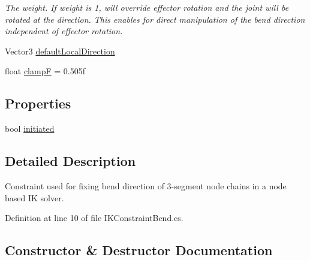 \begin{DoxyCompactItemize}
\begin{DoxyCompactList}\small\item\em The weight. If weight is 1, will override effector rotation and the joint will be rotated at the direction. This enables for direct manipulation of the bend direction independent of effector rotation. \end{DoxyCompactList}\item 
Vector3 \mbox{\hyperlink{class_root_motion_1_1_final_i_k_1_1_i_k_constraint_bend_a763b81b36642630acc2cb8b3720ffd3e}{default\+Local\+Direction}}
\item 
float \mbox{\hyperlink{class_root_motion_1_1_final_i_k_1_1_i_k_constraint_bend_a2aeeb3a0e93c7b1dbb02407b67b0dbdf}{clampF}} = 0.\+505f
\end{DoxyCompactItemize}
\subsection*{Properties}
\begin{DoxyCompactItemize}
\item 
bool \mbox{\hyperlink{class_root_motion_1_1_final_i_k_1_1_i_k_constraint_bend_aad912f433527d08025513c66a2bafce7}{initiated}}
\end{DoxyCompactItemize}


\subsection{Detailed Description}
Constraint used for fixing bend direction of 3-\/segment node chains in a node based IK solver. 



Definition at line 10 of file I\+K\+Constraint\+Bend.\+cs.



\subsection{Constructor \& Destructor Documentation}
\mbox{\label{class_root_motion_1_1_final_i_k_1_1_i_k_constraint_bend_a9327084c04a0563a840d5034a1ef5bd2}} 
